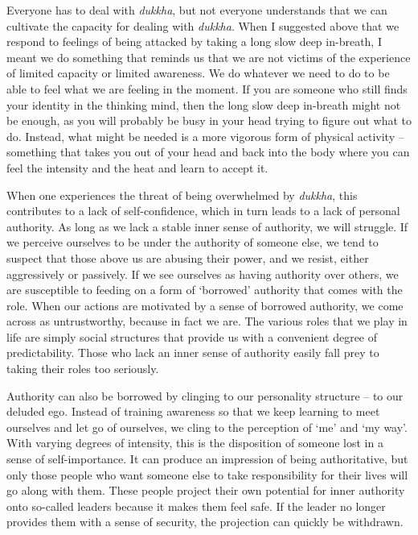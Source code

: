 Everyone has to deal with \emph{dukkha}, but not everyone understands
that we can cultivate the capacity for dealing with \emph{dukkha}. When
I suggested above that we respond to feelings of being attacked by
taking a long slow deep in-breath, I meant we do something that reminds
us that we are not victims of the experience of limited capacity or
limited awareness. We do whatever we need to do to be able to feel what
we are feeling in the moment. If you are someone who still finds your
identity in the thinking mind, then the long slow deep in-breath might
not be enough, as you will probably be busy in your head trying to
figure out what to do. Instead, what might be needed is a more vigorous
form of physical activity -- something that takes you out of your head
and back into the body where you can feel the intensity and the heat and
learn to accept it.

When one experiences the threat of being overwhelmed by \emph{dukkha},
this contributes to a lack of self-confidence, which in turn leads to a
lack of personal authority. As long as we lack a stable inner sense of
authority, we will struggle. If we perceive ourselves to be under the
authority of someone else, we tend to suspect that those above us are
abusing their power, and we resist, either aggressively or passively. If
we see ourselves as having authority over others, we are susceptible to
feeding on a form of `borrowed' authority that comes with the role. When
our actions are motivated by a sense of borrowed authority, we come
across as untrustworthy, because in fact we are. The various roles that
we play in life are simply social structures that provide us with a
convenient degree of predictability. Those who lack an inner sense of
authority easily fall prey to taking their roles too seriously.

Authority can also be borrowed by clinging to our personality structure
-- to our deluded ego. Instead of training awareness so that we keep
learning to meet ourselves and let go of ourselves, we cling to the
perception of `me' and `my way'. With varying degrees of intensity, this
is the disposition of someone lost in a sense of self-importance. It can
produce an impression of being authoritative, but only those people who
want someone else to take responsibility for their lives will go along
with them. These people project their own potential for inner authority
onto so-called leaders because it makes them feel safe. If the leader no
longer provides them with a sense of security, the projection can
quickly be withdrawn.

